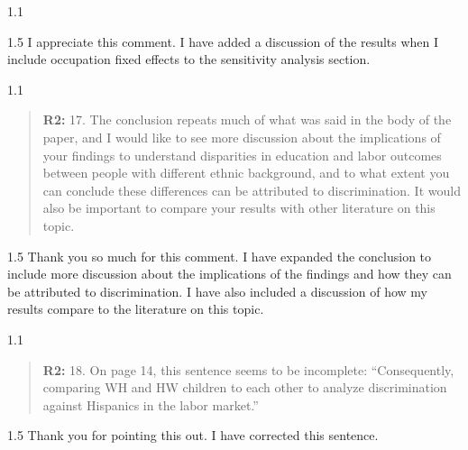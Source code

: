 \documentclass[12pt,english]{article}
\newcommand{\rrquote}{1.1}
\newcommand{\rrxspc}{1.5}
\begin{document}
\begin{refsection}
\begin{spacing}{\rrquote}
\begin{quotation}
        \end{quotation}
        \end{spacing}
            
        \begin{spacing}{\rrxspc}
            I appreciate this comment. I have added a discussion of the results when I include occupation fixed effects to the sensitivity analysis section.
    \end{spacing}

    \begin{spacing}{\rrquote}
        \begin{quotation}
        \textbf{R2: } 17. The conclusion repeats much of what was said in the body of the paper, and I would like to see more discussion about the implications of your findings to understand disparities in education and labor outcomes between people with different ethnic background, and to what extent you can conclude these differences can be attributed to discrimination. It would also be important to compare your results with other literature on this topic.
              
        \end{quotation}
        \end{spacing}
        
        \begin{spacing}{\rrxspc}
            Thank you so much for this comment. I have expanded the conclusion to include more discussion about the implications of the findings and how they can be attributed to discrimination. I have also included a discussion of how my results compare to the literature on this topic.
    \end{spacing}

    \begin{spacing}{\rrquote}
        \begin{quotation}
        \textbf{R2: } 18. On page 14, this sentence seems to be incomplete: “Consequently, comparing WH and HW children to each other to analyze discrimination against Hispanics in the labor market.”

              
        \end{quotation}
        \end{spacing}
        
        \begin{spacing}{\rrxspc}
            Thank you for pointing this out. I have corrected this sentence.
    \end{spacing}


\end{refsection}
\end{document}
